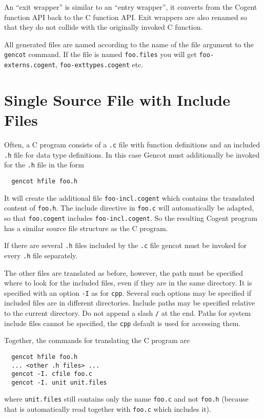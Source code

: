 \documentclass[a4paper]{report}
\newcommand{\code}[1]{\textnormal{\texttt{#1}}}
\begin{document}
An ``exit wrapper'' is similar to an ``entry wrapper'', it converts from the Cogent function API back to the C function API.
Exit wrappers are also renamed so that they do not collide with the originally invoked C function.

All generated files are named according to the name of the file argument to the \code{gencot} command. If the file is named 
\code{foo.files} you will get \code{foo-externs.cogent}, \code{foo-exttypes.cogent} etc.

\section{Single Source File with Include Files}
\label{simple-include}

Often, a C program consists of a \code{.c} file with function definitions and an included \code{.h} file for data type 
definitions. In this case Gencot must additionally be invoked for the \code{.h} file in the form
\begin{verbatim}
  gencot hfile foo.h
\end{verbatim}
It will create the additional file \code{foo-incl.cogent} which contains the translated content of \code{foo.h}. The 
include directive in \code{foo.c} will automatically be adapted, so that \code{foo.cogent} includes \code{foo-incl.cogent}.
So the resulting Cogent program has a similar source file structure as the C program.

If there are several \code{.h} files included by the \code{.c} file gencot must be invoked for every \code{.h} file
separately.

The other files are translated as before, however, the path must be specified where to look for the included files, even
if they are in the same directory. It is specified with an option \code{-I} as for \code{cpp}. Several such options may 
be specified if included files are in different directories. Include paths may be specified relative to the current 
directory. Do not append a slash \code{/} at the end. Paths for system include files cannot be specified, the \code{cpp} 
default is used for accessing them.

Together, the commands for translating the C program are
\begin{verbatim}
  gencot hfile foo.h
  ... <other .h files> ...
  gencot -I. cfile foo.c
  gencot -I. unit unit.files
\end{verbatim}
where \code{unit.files} still contains only the name \code{foo.c} and not \code{foo.h} (because that is automatically
read together with \code{foo.c} which includes it).
\end{document}
